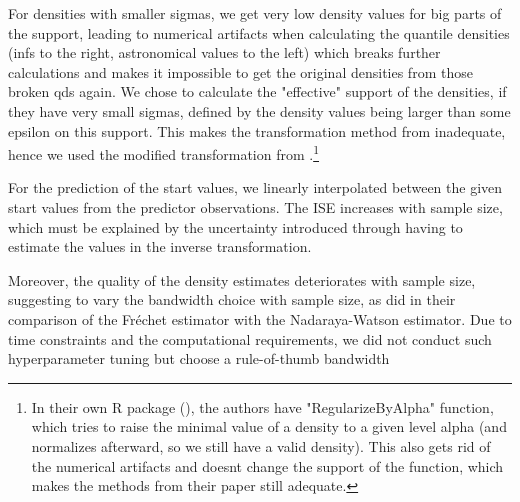 For densities with smaller sigmas, we get very low density values for big parts of the
support, leading to numerical artifacts when calculating the quantile densities (infs
to the right, astronomical values to the left) which breaks further calculations and
makes it impossible to get the original densities from those broken qds again. We chose
to calculate the "effective" support of the densities, if they have very small sigmas,
defined by the density values being larger than some epsilon on this support. This
makes the transformation method from \textcite{PetersenMüller2016} inadequate, hence we
used the modified transformation from \textcite{KokoszkaEtAl2019}.\footnote{In their own R
package (), the authors have "RegularizeByAlpha" function, which tries to raise the minimal
value of a density to a given level alpha (and normalizes afterward, so we still have a
valid density). This also gets rid of the numerical artifacts and doesnt change the
support of the function, which makes the methods from their paper still adequate.}


For the prediction of the start values, we linearly interpolated between the given start
values from the predictor observations. The ISE increases with sample size, which must
be explained by the uncertainty introduced through having to estimate the values in the
inverse transformation.

Moreover, the quality of the density estimates deteriorates with sample size, suggesting
to vary the bandwidth choice with sample size, as \textcite{PetersenMüller2019} did in
their comparison of the Fréchet estimator with the Nadaraya-Watson estimator. Due to
time constraints and the computational requirements, we did not conduct such
hyperparameter tuning but choose a rule-of-thumb bandwidth
\parencites[Chapter~3.4.1]{Silverman1986}[Chapter~2.2.1]{LiRacine2007}
